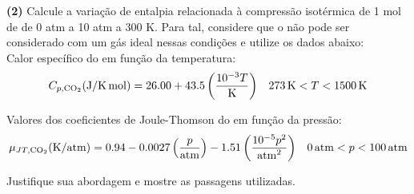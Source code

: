 \textbf{(2)} Calcule a variação de entalpia relacionada à compressão isotérmica
de 1 mol de  de 0 atm a 10 atm a 300 K. Para tal, considere que o
 não pode ser considerado com um gás ideal nessas condições e utilize os
dados abaixo:\\

Calor específico do  em função da temperatura:
\begin{align*}
    C_{p, \ce{CO2}} (\unit{J \per K . mol}) = \num{26.00} + \num{43.5} \left(\frac{10^{-3}
    T}{\unit{K}}\right) && \qty{273}{K} < T < \qty{1500}{K}
\end{align*}

Valores dos coeficientes de Joule-Thomson do  em função da pressão:
\begin{align*}
    \mu_{JT, \ce{CO2}} (\unit{K} / \unit{atm}) = \num{0.94} - \num{0.0027} \left(
    \frac{p}{\unit{atm}} \right) - \num{1.51} \left( \frac{10^{-5}
    p^2}{\unit{atm}^2} \right) && \qty{0}{atm} < p < \qty{100}{atm}
\end{align*}

Justifique sua abordagem e mostre as passagens utilizadas.\\

